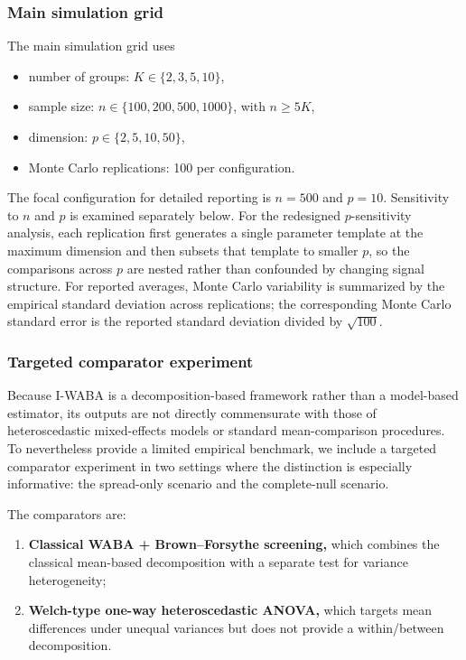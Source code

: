 \documentclass[preprint, times, 12pt, authoryear]{elsarticle}
\begin{document}
\subsubsection{Main simulation grid}

The main simulation grid uses
\begin{itemize}
	\item number of groups: $K \in \{2,3,5,10\}$,
	\item sample size: $n \in \{100,200,500,1000\}$, with $n\ge 5K$,
	\item dimension: $p \in \{2,5,10,50\}$,
	\item Monte Carlo replications: 100 per configuration.
\end{itemize}

The focal configuration for detailed reporting is $n=500$ and $p=10$. Sensitivity to $n$ and $p$ is examined separately below. For the redesigned $p$-sensitivity analysis, each replication first generates a single parameter template at the maximum dimension and then subsets that template to smaller $p$, so the comparisons across $p$ are nested rather than confounded by changing signal structure. For reported averages, Monte Carlo variability is summarized by the empirical standard deviation across replications; the corresponding Monte Carlo standard error is the reported standard deviation divided by $\sqrt{100}$.

\subsubsection{Targeted comparator experiment}

Because I-WABA is a decomposition-based framework rather than a model-based estimator, its outputs are not directly commensurate with those of heteroscedastic mixed-effects models or standard mean-comparison procedures. To nevertheless provide a limited empirical benchmark, we include a targeted comparator experiment in two settings where the distinction is especially informative: the spread-only scenario and the complete-null scenario.

The comparators are:
\begin{enumerate}[label=(\alph*)]
	\item \textbf{Classical WABA + Brown--Forsythe screening,} which combines the classical mean-based decomposition with a separate test for variance heterogeneity;
	\item \textbf{Welch-type one-way heteroscedastic ANOVA,} which targets mean differences under unequal variances but does not provide a within/between decomposition.
\end{enumerate}
\end{document}
